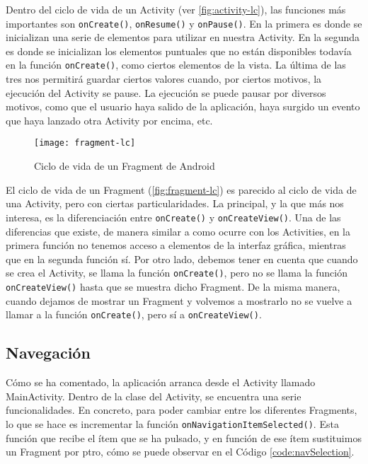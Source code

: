 Dentro del ciclo de vida de un Activity (ver \autoref{fig:activity-lc}), las funciones más importantes son \texttt{onCreate()}, \texttt{onResume()} y \texttt{onPause()}. En la primera es donde se inicializan una serie de elementos para utilizar en nuestra Activity. En la segunda es donde se inicializan los elementos puntuales que no están disponibles todavía en la función \texttt{onCreate()}, como ciertos elementos de la vista. La última de las tres nos permitirá guardar ciertos valores cuando, por ciertos motivos, la ejecución del Activity se pause. La ejecución se puede pausar por diversos motivos, como que el usuario haya salido de la aplicación, haya surgido un evento que haya lanzado otra Activity por encima, etc.

\begin{figure}[H]
	\centering
	\texttt{[image: fragment-lc]}
	\caption{Ciclo de vida de un Fragment de Android}
	\label{fig:fragment-lc}
\end{figure}

El ciclo de vida de un Fragment (\autoref{fig:fragment-lc}) es parecido al ciclo de vida de una Activity, pero con ciertas particularidades. La principal, y la que más nos interesa, es la diferenciación entre \texttt{onCreate()} y \texttt{onCreateView()}. Una de las diferencias que existe, de manera similar a como ocurre con los Activities, en la primera función no tenemos acceso a elementos de la interfaz gráfica, mientras que en la segunda función sí. Por otro lado, debemos tener en cuenta que cuando se crea el Activity, se llama la función \texttt{onCreate()}, pero no se llama la función \texttt{onCreateView()} hasta que se muestra dicho Fragment. De la misma manera, cuando dejamos de mostrar un Fragment y volvemos a mostrarlo no se vuelve a llamar a la función \texttt{onCreate()}, pero sí a \texttt{onCreateView()}.

\subsection{Navegación}

Cómo se ha comentado, la aplicación arranca desde el Activity llamado MainActivity. Dentro de la clase del Activity, se encuentra una serie funcionalidades. En concreto, para poder cambiar entre los diferentes Fragments, lo que se hace es incrementar la función \texttt{onNavigationItemSelected()}. Esta función que recibe el ítem que se ha pulsado, y en función de ese ítem sustituimos un Fragment por ptro, cómo se puede observar en el Código \ref{code:navSelection}.

